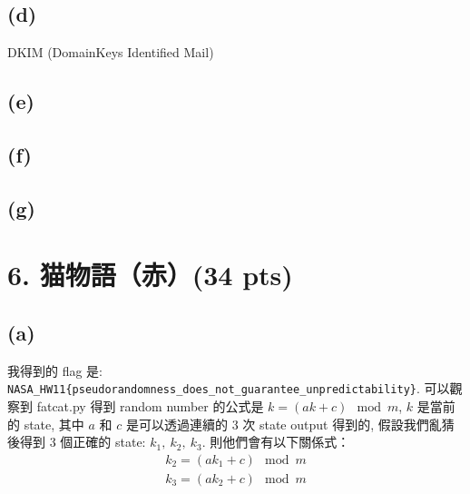 \documentclass[12pt]{article}
\begin{document}
\subsection*{(d)}
DKIM (DomainKeys Identified Mail)
\subsection*{(e)}
\subsection*{(f)}
\subsection*{(g)}

\newpage
\section*{6. 猫物語（赤）(34 pts)}
\subsection*{(a)}
我得到的 flag 是: \verb|NASA_HW11{pseudorandomness_does_not_guarantee_unpredictability}|. 可以觀察到 fatcat.py 得到 random number 的公式是 $k=(ak+c)\mod{m}$, $k$ 是當前的 state, 其中 $a$ 和 $c$ 是可以透過連續的 3 次 state output 得到的, 假設我們亂猜後得到 3 個正確的 state: $k_1,\ k_2,\ k_3$. 則他們會有以下關係式：
\begin{align*}
    k_2=(ak_1+c)\mod{m} \\
    k_3=(ak_2+c)\mod{m}
\end{align*}
\end{document}
